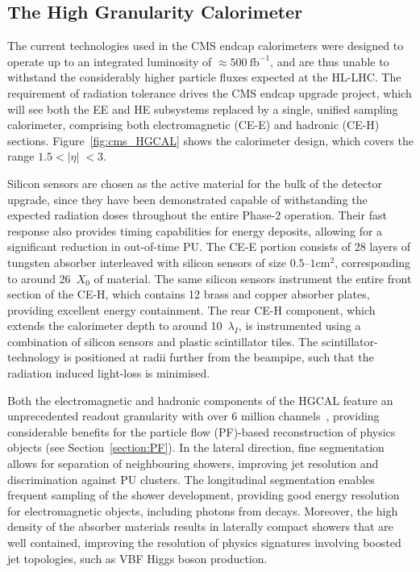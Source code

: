 \subsection{The High Granularity Calorimeter}

The current technologies used in the CMS endcap calorimeters were designed to operate up to an integrated luminosity of ${\approx}500~\mathrm{fb}^{-1}$, and are thus unable to withstand the considerably higher particle fluxes expected at the HL-LHC. The requirement of radiation tolerance drives the CMS endcap upgrade project, which will see both the EE and HE subsystems replaced by a single, unified sampling calorimeter, comprising both electromagnetic (CE-E) and hadronic (CE-H) sections. Figure~\ref{fig:cms_HGCAL} shows the calorimeter design, which covers the range $1.5<|\eta|\;<3$. 

Silicon sensors are chosen as the active material for the bulk of the detector upgrade, since they have been demonstrated capable of withstanding the expected radiation doses throughout the entire Phase-2 operation. Their fast response also provides timing capabilities for energy deposits, allowing for a significant reduction in out-of-time PU. The CE-E portion consists of 28 layers of tungsten absorber interleaved with silicon sensors of size $0.5$--$1\mathrm{cm}^{2}$, corresponding to around 26~$X_{0}$ of material. The same silicon sensors instrument the entire front section of the CE-H, which contains 12 brass and copper absorber plates, providing excellent energy containment. The rear CE-H component, which extends the calorimeter depth to around 10~$\lambda_{I}$, is instrumented using a combination of silicon sensors and plastic scintillator tiles. The scintillator-technology is positioned at radii further from the beampipe, such that the radiation induced light-loss is minimised. %

Both the electromagnetic and hadronic components of the HGCAL feature an unprecedented readout granularity with over 6 million channels~\cite{CMS_phase2_HGCAL}, providing considerable benefits for the particle flow (PF)-based reconstruction of physics objects (see Section~\ref{section:PF}). In the lateral direction, fine segmentation allows for separation of neighbouring showers, improving jet resolution and discrimination against PU clusters. The longitudinal segmentation enables frequent sampling of the shower development, providing good energy resolution for electromagnetic objects, including photons from \Hgg decays. Moreover, the high density of the absorber materials results in laterally compact showers that are well contained, improving the resolution of physics signatures involving boosted jet topologies, such as VBF Higgs boson production. %


